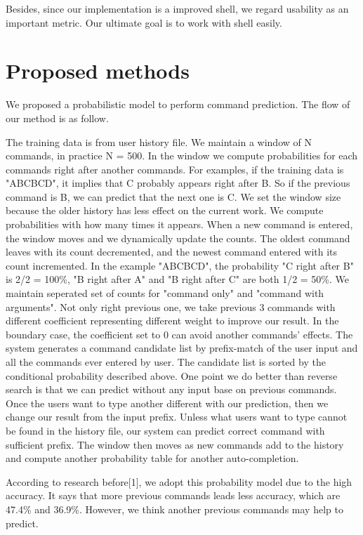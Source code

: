 \documentclass[11pt,a4paper]{article}
\begin{document}
Besides, since our implementation is a improved shell, we regard usability as an important metric.
Our ultimate goal is to work with shell easily.

\section*{Proposed methods}
We proposed a probabilistic model to perform command prediction.
The flow of our method is as follow.
\par
The training data is from user history file. 
We maintain a window of N commands, in practice N = 500. 
In the window we compute probabilities for each commands right after another commands. 
For examples, if the training data is "ABCBCD", it implies that C probably appears right after B.
So if the previous command is B, we can predict that the next one is C.
We set the window size because the older history has less effect on the current work. 
We compute probabilities with how many times it appears.
When a new command is entered, the window moves and we dynamically update the counts. The oldest command leaves with its count decremented, and the newest command entered with its count incremented.
In the example "ABCBCD", the probability "C right after B" is 2/2 = 100\%, 
"B right after A" and "B right after C" are both 1/2 = 50\%. 
We maintain seperated set of counts for "command only" and "command with arguments".
Not only right previous one, we take previous 3 commands with different coefficient representing different weight to improve our result.
In the boundary case, the coefficient set to 0 can avoid another commands' effects. 
The system generates a command candidate list by prefix-match of the user input and all the commands ever entered by user.
The candidate list is sorted by the conditional probability described above.
One point we do better than reverse search is that we can predict without any input base on previous commands. 
Once the users want to type another different with our prediction, then we change our result from the input prefix.
Unless what users want to type cannot be found in the history file, 
our system can predict correct command with sufficient prefix.
The window then moves as new commands add to the history and compute another probability table for another auto-completion.
\par
According to research before[1], we adopt this probability model due to the high accuracy. 
It says that more previous commands leads less accuracy, which are 47.4\% and 36.9\%. 
However, we think another previous commands may help to predict. 
\end{document}
